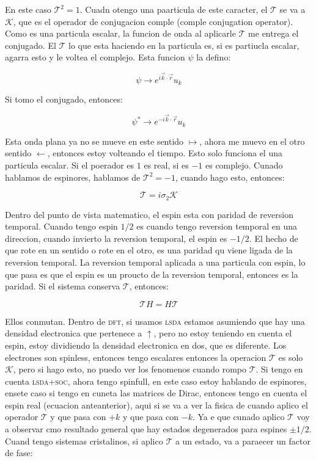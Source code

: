 \documentclass[11pt,fleqn]{book}
\begin{document}
En este caso $\mathcal{T}^{2}=1$. Cuadn otengo una paarticula de este caracter, el $\mathcal{T}$ se va a $\mathcal{K}$, que es el operador de conjugacion comple (comple conjugation operator). Como es una particula escalar, la funcion de onda al aplicarle $\mathcal{T}$ me entrega el conjugado. El $\mathcal{T}$ lo que esta haciendo en la particula es, si es partiucla escalar, agarra esto y le voltea el complejo. Esta funcion $\psi$ la defino:

\begin{equation}
    \psi\rightarrow e^{i\vec{k}\cdot\vec{r}}u_{k}
\end{equation}

Si tomo el conjugado, entonces:

\begin{equation}
    \psi^{\ast}\rightarrow e^{-i\vec{k}\cdot\vec{r}}u_{k}
\end{equation}

Esta onda plana ya no se mueve en este sentido $\mapsto$, ahora me muevo en el otro sentido $\leftarrow$, entonces estoy volteando el tiempo. Esto solo funciona el una particula escalar. Si el poerador es $1$ es real, si es $-1$ es complejo. Cunado hablamos de espinores, hablamos de $\mathcal{T}^{2}=-1$, cuando hago esto, entonces:

\begin{equation}
    \mathcal{T}=i\sigma_{2}\mathcal{K}
\end{equation}

Dentro del punto de vista matematico, el espin esta con paridad de reversion temporal. Cuando tengo espin $1/2$ es cuando tengo reversion temporal en una direccion, cuando invierto la reversion temporal, el espin es $-1/2$. El hecho de que rote en un sentido o rote en el otro, es una paridad qu viene ligada de la reversion temporal. La reversion temporal aplicada a una particula con espin, lo que pasa es que el espin es un proucto de la reversion temporal, entonces es la paridad. Si el sistema conserva $\mathcal{T}$, entonces:

\begin{equation}
    \mathcal{T}H=H\mathcal{T}
\end{equation}

Ellos conmutan. Dentro de \textsc{dft}, si usamos \textsc{lsda} estamos asumiendo que hay una densidad electronica que pertenece a $\uparrow$, pero no estoy teniendo en cuenta el espin, estoy dividiendo la densidad electronica en dos, que es diferente. Los electrones son spinless, entonces tengo escalares entonces la operacion $\mathcal{T} $ es solo $\mathcal{K}$, pero si hago esto, no puedo ver los fenomenos cuando rompo $\mathcal{T}$. Si tengo en cuenta \textsc{lsda+soc}, ahora tengo spinfull, en este caso estoy hablando de espinores, ensete caso si tengo en cuneta las matrices de Dirac, entonces tengo en cuenta el espin real (ecuacion anteanterior), aqui si se va a ver la fisica de cuando aplico el operador $\mathcal{T}$ y que pasa con $+k$ y que pasa con $-k$. Ya e que cunado aplico $\mathcal{T}$ voy a observar cmo resultado general que hay estados degenerados para espines $\pm1/2$. Cuand tengo sistemas cristalinos, si aplico $\mathcal{T}$ a un estado, va a paraecer un factor de fase:
\end{document}
